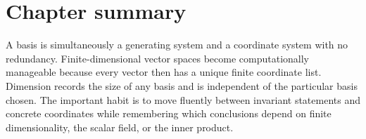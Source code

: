\section*{Chapter summary}
A basis is simultaneously a generating system and a coordinate system with no redundancy. Finite-dimensional vector spaces become computationally manageable because every vector then has a unique finite coordinate list. Dimension records the size of any basis and is independent of the particular basis chosen.
The important habit is to move fluently between invariant statements and concrete coordinates while remembering which conclusions depend on finite dimensionality, the scalar field, or the inner product.
